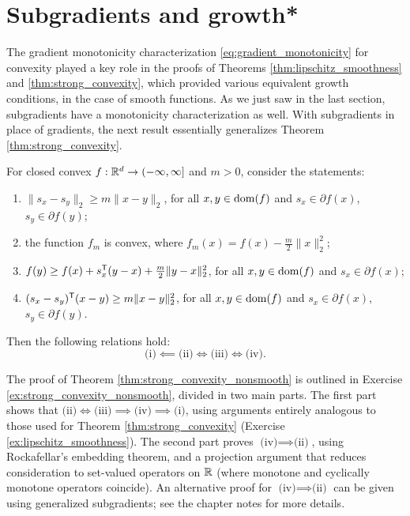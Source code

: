 \section{Subgradients and growth*}

The gradient monotonicity characterization \eqref{eq:gradient_monotonicity} for
convexity played a key role in the proofs of Theorems
\ref{thm:lipschitz_smoothness} and \ref{thm:strong_convexity}, which provided 
various equivalent growth conditions, in the case of smooth functions. As we
just saw in the last section, subgradients have a monotonicity characterization
as well. With subgradients in place of gradients, the next result essentially
generalizes Theorem \ref{thm:strong_convexity}.     

\begin{Theorem}
\label{thm:strong_convexity_nonsmooth}
For closed convex $f : \mathbb{R}^d \to (-\infty, \infty]$ and $m>0$, consider the
statements:     
\begin{enumerate}[label=(\roman*)]
\item $\|s_x - s_y\|_2 \geq m \|x-y\|_2$, for all $x,y \in \operatorname{dom}(f)$ and 
  $s_x \in \partial f(x)$, $s_y \in \partial f(y)$;  
\item the function $f_m$ is convex, where $f_m(x) = f(x) - \frac{m}{2}
  \|x\|_2^2$;    
\item $f(y) \geq f(x) + s_x^{\mathsf{T}} (y-x) + \frac{m}{2} \|y-x\|_2^2$, for all $x,y
  \in \operatorname{dom}(f)$ and $s_x \in \partial f(x)$; 
\item $(s_x - s_y)^{\mathsf{T}} (x - y) \geq m\|x-y\|_2^2$, for all $x,y \in \operatorname{dom}(f)$ and
  $s_x \in \partial f(x)$, $s_y \in \partial f(y)$.  
\end{enumerate}
Then the following relations hold: 
\[
\text{(i)} \impliedby \text{(ii)} \iff \text{(iii)} \iff \text{(iv)}.
\]
\end{Theorem}

The proof of Theorem \ref{thm:strong_convexity_nonsmooth} is outlined in
Exercise \ref{ex:strong_convexity_nonsmooth}, divided in two main parts. The
first part shows that $\text{(ii)} \iff \text{(iii)} \implies \text{(iv)}
\implies \text{(i)}$, using arguments entirely analogous to those used for
Theorem \ref{thm:strong_convexity} (Exercise \ref{ex:lipschitz_smoothness}). The
second part proves $\text{(iv)} \implies \text{(ii)}$, using Rockafellar's
embedding theorem, and a projection argument that reduces consideration to
set-valued operators on $\mathbb{R}$ (where monotone and cyclically monotone operators
coincide). An alternative proof for $\text{(iv)} \implies \text{(ii)}$ can be
given using generalized subgradients; see the chapter notes for more details.

